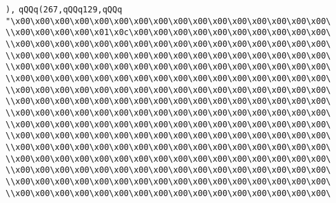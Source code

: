 \verb|),|\newline
\verb|qQQq(267,qQQq129,qQQq|\newline
\verb|"\x00\x00\x00\x00\x00\x00\x00\x00\x00\x00\x00\x00\x00\x00\x00\x00\|\newline
\verb|\\x00\x00\x00\x00\x01\x0c\x00\x00\x00\x00\x00\x00\x00\x00\x00\x00\|\newline
\verb|\\x00\x00\x00\x00\x00\x00\x00\x00\x00\x00\x00\x00\x00\x00\x00\x00\|\newline
\verb|\\x00\x00\x00\x00\x00\x00\x00\x00\x00\x00\x00\x00\x00\x00\x00\x00\|\newline
\verb|\\x00\x00\x00\x00\x00\x00\x00\x00\x00\x00\x00\x00\x00\x00\x00\x00\|\newline
\verb|\\x00\x00\x00\x00\x00\x00\x00\x00\x00\x00\x00\x00\x00\x00\x00\x00\|\newline
\verb|\\x00\x00\x00\x00\x00\x00\x00\x00\x00\x00\x00\x00\x00\x00\x00\x00\|\newline
\verb|\\x00\x00\x00\x00\x00\x00\x00\x00\x00\x00\x00\x00\x00\x00\x00\x00\|\newline
\verb|\\x00\x00\x00\x00\x00\x00\x00\x00\x00\x00\x00\x00\x00\x00\x00\x00\|\newline
\verb|\\x00\x00\x00\x00\x00\x00\x00\x00\x00\x00\x00\x00\x00\x00\x00\x00\|\newline
\verb|\\x00\x00\x00\x00\x00\x00\x00\x00\x00\x00\x00\x00\x00\x00\x00\x00\|\newline
\verb|\\x00\x00\x00\x00\x00\x00\x00\x00\x00\x00\x00\x00\x00\x00\x00\x00\|\newline
\verb|\\x00\x00\x00\x00\x00\x00\x00\x00\x00\x00\x00\x00\x00\x00\x00\x00\|\newline
\verb|\\x00\x00\x00\x00\x00\x00\x00\x00\x00\x00\x00\x00\x00\x00\x00\x00\|\newline
\verb|\\x00\x00\x00\x00\x00\x00\x00\x00\x00\x00\x00\x00\x00\x00\x00\x00\|\newline
\verb|\\x00\x00\x00\x00\x00\x00\x00\x00\x00\x00\x00\x00\x00\x00\x00\x00\|\newline
